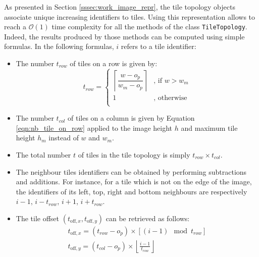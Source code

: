 \label{apdx:tile_topology}

As presented in Section \ref{sssec:work_image_repr}, the tile topology objects associate unique increasing identifiers to tiles. Using this representation allows to reach a $\mathcal{O}(1)$ time complexity for all the methods of the class \texttt{TileTopology}. Indeed, the results produced by those methods can be computed using simple formulas. In the following formulas, $i$ refers to a tile identifier:

\begin{itemize}
	\item The number $t_{row}$ of tiles on a row is given by:
	\begin{equation} \label{eqn:nb_tile_on_row}
		t_{row} = \left\{
		\begin{array}{cl}
			\left\lceil \dfrac{w - o_p}{w_m - o_p}\right\rceil&\text{, if } w > w_m\\
			1&\text{, otherwise}\\
		\end{array}
		\right.	
	\end{equation}
	\item The number $t_{col}$ of tiles on a column is given by Equation \ref{eqn:nb_tile_on_row} applied to the image height $h$ and maximum tile height $h_m$ instead of $w$ and $w_m$. 
	\item The total number $t$ of tiles in the tile topology is simply $t_{row} \times t_{col}$.
	\item The neighbour tiles identifiers can be obtained by performing subtractions and additions. For instance, for a tile  which is not on the edge of the image, the identifiers of its left, top, right and bottom neighbours are respectively $i - 1$, $i - t_{row}$, $i + 1$, $i + t_{row}$.
	\item The tile offset $(t_{\text{off},x}, t_{\text{off},y})$ can be retrieved as follows:
	\begin{eqnarray}
		t_{\text{off},x} = (t_{row} - o_p) \times \left[(i-1) \mod t_{row} \right] \\
		t_{\text{off},y} = (t_{col} - o_p) \times \left\lfloor\frac{i - 1}{t_{row}}\right\rfloor
	\end{eqnarray} 
\end{itemize}